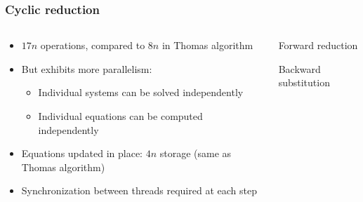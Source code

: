 \begin{frame}
\frametitle{Cyclic reduction}
\begin{columns}
\begin{column}{0.5\textwidth}
\begin{itemize}
\item $17n$ operations,
    compared to $8n$ in Thomas algorithm
\item But exhibits more parallelism:
\begin{itemize}
    \item Individual systems can be solved independently
    \item Individual equations can be computed independently
\end{itemize}
\item Equations updated in place: $4n$ storage (same as Thomas algorithm)
\item Synchronization between threads required at each step
\end{itemize}
\end{column}
\begin{column}{0.5\textwidth}
\centering
Forward reduction

\centering
Backward substitution
\end{column}
\end{columns}
\end{frame}


